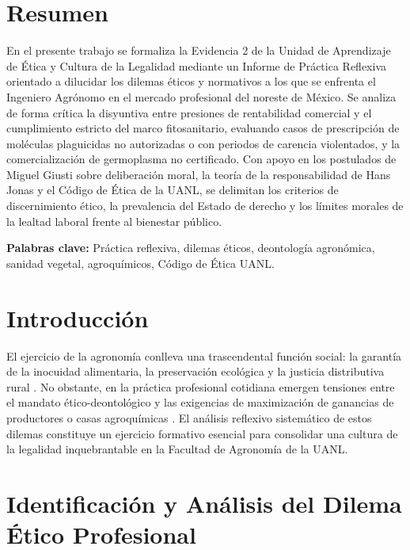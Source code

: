 \documentclass[spanish,letterpaper,oneside]{article}
\begin{document}
\hypersetup{pageanchor=false}
\begingroup
\fontsize{14}{17}\selectfont
\renewcommand{\Huge}{\fontsize{14}{17}\selectfont\bfseries}
\renewcommand{\large}{\fontsize{14}{17}\selectfont}
\templatePortrait
\clearpage
\endgroup
\hypersetup{pageanchor=true}
\templatePagecfg
\singlespacing
\setlength{\tabcolsep}{8pt}
\renewcommand{\arraystretch}{1.18}

\section*{Resumen}
En el presente trabajo se formaliza la Evidencia 2 de la Unidad de Aprendizaje de Ética y Cultura de la Legalidad mediante un Informe de Práctica Reflexiva orientado a dilucidar los dilemas éticos y normativos a los que se enfrenta el Ingeniero Agrónomo en el mercado profesional del noreste de México. Se analiza de forma crítica la disyuntiva entre presiones de rentabilidad comercial y el cumplimiento estricto del marco fitosanitario, evaluando casos de prescripción de moléculas plaguicidas no autorizadas o con periodos de carencia violentados, y la comercialización de germoplasma no certificado. Con apoyo en los postulados de Miguel Giusti sobre deliberación moral, la teoría de la responsabilidad de Hans Jonas y el Código de Ética de la UANL, se delimitan los criterios de discernimiento ético, la prevalencia del Estado de derecho y los límites morales de la lealtad laboral frente al bienestar público.

\vspace{0.4cm}
\noindent\textbf{Palabras clave:} Práctica reflexiva, dilemas éticos, deontología agronómica, sanidad vegetal, agroquímicos, Código de Ética UANL.

\section{Introducción}
El ejercicio de la agronomía conlleva una trascendental función social: la garantía de la inocuidad alimentaria, la preservación ecológica y la justicia distributiva rural \parencite{cortina2013}. No obstante, en la práctica profesional cotidiana emergen tensiones entre el mandato ético-deontológico y las exigencias de maximización de ganancias de productores o casas agroquímicas \parencite{giusti2018}. El análisis reflexivo sistemático de estos dilemas constituye un ejercicio formativo esencial para consolidar una cultura de la legalidad inquebrantable en la Facultad de Agronomía de la UANL.

\section{Identificación y Análisis del Dilema Ético Profesional}
\end{document}

